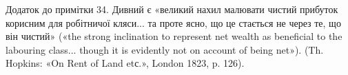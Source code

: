 Додаток до примітки 34. Дивний є «великий нахил малювати чистий прибуток корисним для робітничої
кляси... та проте ясно, що це стається не через те, що він чистий» («the strong inclination to
represent net wealth as beneficial to the labouring class... though it is evidently not on account
of being net»). (Th. Hopkins: «On Rent of Land etс.», London 1823, p. 126).